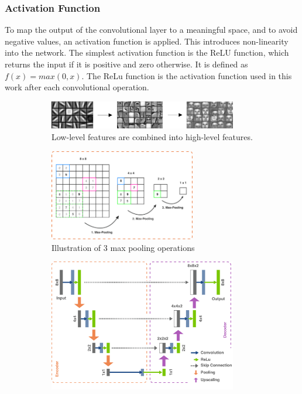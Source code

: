 \subsubsection*{Activation Function}

To map the output of the convolutional layer to a meaningful space, and to avoid negative values, an activation function is applied. This introduces non-linearity into the network. The simplest activation function is the ReLU function, which returns the input if it is positive and zero otherwise. It is defined as $f(x) = max(0, x)$. The ReLu function is the activation function used in this work after each convolutional operation.

\begin{figure}[H]
    \begin{subfigure}{1\textwidth}
        \centering
        \includegraphics[width=0.9\textwidth]{resources/images/abstraction.png}
        \caption{Low-level features are combined into high-level features.}
        \label{fig: abstraction}
    \end{subfigure}
    \begin{subfigure}{\textwidth}
        \centering
        \vspace{0.5cm}
        \includegraphics[width=0.7\textwidth]{resources/images/max_pooling.png}
        \caption{Illustration of 3 max pooling operations}
        \label{fig: max_pooling}
    \end{subfigure}
    \begin{subfigure}{\textwidth}
        \centering
        \vspace{0.5cm}
        \includegraphics[width=0.9\textwidth]{resources/images/u_net.png}

\end{subfigure}
\end{figure}
